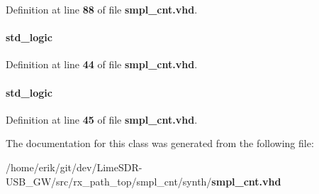 Definition at line {\bf 88} of file {\bf smpl\+\_\+cnt.\+vhd}.

\paragraph[{one\+\_\+ch}]{ {\bfseries \textcolor{comment}{std\+\_\+logic}\textcolor{vhdlchar}{ }} \hspace{0.3cm}{\ttfamily [Signal]}}\label{classsmpl__cnt_1_1arch_af2003ffdfbe36b172a7d218ef880b9b7}


Definition at line {\bf 44} of file {\bf smpl\+\_\+cnt.\+vhd}.

\paragraph[{shift\+\_\+cnt\+\_\+out}]{ {\bfseries \textcolor{comment}{std\+\_\+logic}\textcolor{vhdlchar}{ }} \hspace{0.3cm}{\ttfamily [Signal]}}\label{classsmpl__cnt_1_1arch_aaa2f0e241a8d50b672575fcd0e10effb}


Definition at line {\bf 45} of file {\bf smpl\+\_\+cnt.\+vhd}.



The documentation for this class was generated from the following file\+:\begin{DoxyCompactItemize}
\item 
/home/erik/git/dev/\+Lime\+S\+D\+R-\/\+U\+S\+B\+\_\+\+G\+W/src/rx\+\_\+path\+\_\+top/smpl\+\_\+cnt/synth/{\bf smpl\+\_\+cnt.\+vhd}\end{DoxyCompactItemize}

